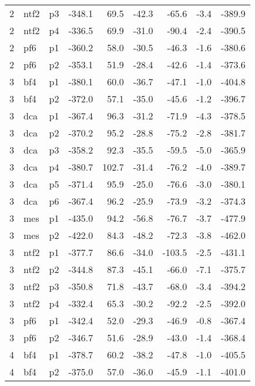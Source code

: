 \documentclass[a4paper]{article}
\begin{document}
\begin{table}[ht]
\begin{tabular}{rllrrrrrr}
   2 & ntf2 & p3 & -348.1 & 69.5 & -42.3 & -65.6 & -3.4 & -389.9 \\ 
   2 & ntf2 & p4 & -336.5 & 69.9 & -31.0 & -90.4 & -2.4 & -390.5 \\ 
   2 & pf6 & p1 & -360.2 & 58.0 & -30.5 & -46.3 & -1.6 & -380.6 \\ 
   2 & pf6 & p2 & -353.1 & 51.9 & -28.4 & -42.6 & -1.4 & -373.6 \\ 
   3 & bf4 & p1 & -380.1 & 60.0 & -36.7 & -47.1 & -1.0 & -404.8 \\ 
   3 & bf4 & p2 & -372.0 & 57.1 & -35.0 & -45.6 & -1.2 & -396.7 \\ 
   3 & dca & p1 & -367.4 & 96.3 & -31.2 & -71.9 & -4.3 & -378.5 \\ 
   3 & dca & p2 & -370.2 & 95.2 & -28.8 & -75.2 & -2.8 & -381.7 \\ 
   3 & dca & p3 & -358.2 & 92.3 & -35.5 & -59.5 & -5.0 & -365.9 \\ 
   3 & dca & p4 & -380.7 & 102.7 & -31.4 & -76.2 & -4.0 & -389.7 \\ 
   3 & dca & p5 & -371.4 & 95.9 & -25.0 & -76.6 & -3.0 & -380.1 \\ 
   3 & dca & p6 & -367.4 & 96.2 & -25.9 & -73.9 & -3.2 & -374.3 \\ 
   3 & mes & p1 & -435.0 & 94.2 & -56.8 & -76.7 & -3.7 & -477.9 \\ 
   3 & mes & p2 & -422.0 & 84.3 & -48.2 & -72.3 & -3.8 & -462.0 \\ 
   3 & ntf2 & p1 & -377.7 & 86.6 & -34.0 & -103.5 & -2.5 & -431.1 \\ 
   3 & ntf2 & p2 & -344.8 & 87.3 & -45.1 & -66.0 & -7.1 & -375.7 \\ 
   3 & ntf2 & p3 & -350.8 & 71.8 & -43.7 & -68.0 & -3.4 & -394.2 \\ 
   3 & ntf2 & p4 & -332.4 & 65.3 & -30.2 & -92.2 & -2.5 & -392.0 \\ 
   3 & pf6 & p1 & -342.4 & 52.0 & -29.3 & -46.9 & -0.8 & -367.4 \\ 
   3 & pf6 & p2 & -346.7 & 51.6 & -28.9 & -43.0 & -1.4 & -368.4 \\ 
   4 & bf4 & p1 & -378.7 & 60.2 & -38.2 & -47.8 & -1.0 & -405.5 \\ 
   4 & bf4 & p2 & -375.0 & 57.0 & -36.0 & -45.9 & -1.1 & -401.0 \\ 

\end{tabular}
\end{table}
\end{document}
